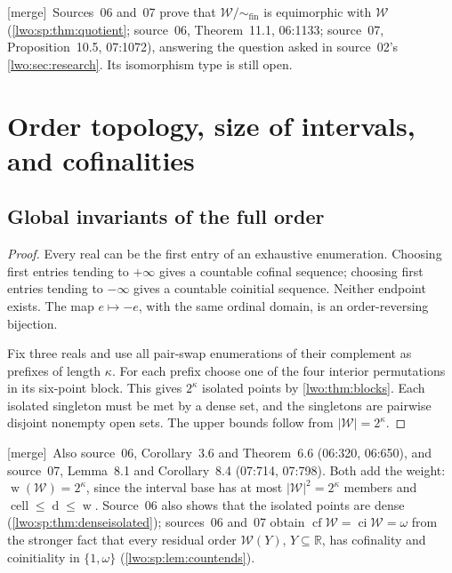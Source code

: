 \documentclass[11pt,a4paper]{article}
\newtheorem{proposition}[theorem]{Proposition}
\theoremstyle{definition}
\theoremstyle{remark}
\newcommand{\R}{\mathbb R}
\newcommand{\W}{\mathcal W}
\newcommand{\cf}{\operatorname{cf}}
\newcommand{\ci}{\operatorname{ci}}
\newcommand{\dens}{\operatorname{d}}
\newcommand{\cell}{\operatorname{cell}}
\newcommand{\weight}{\operatorname{w}}
\newcommand{\Wq}{\W/{\sim_{\mathrm{fin}}}}
\newcommand{\merge}{\textsf{[merge]}}
\begin{document}
\merge\ Sources~06 and~07 prove that $\Wq$ is equimorphic with $\W$
(\cref{lwo:sp:thm:quotient}; source~06, Theorem~11.1, 06:1133; source~07,
Proposition~10.5, 07:1072),
answering the question asked in source~02's \cref{lwo:sec:research}. Its
isomorphism type is still open.

\section{Order topology, size of intervals, and cofinalities}
\label{lwo:sec:topology}

\subsection{Global invariants of the full order}

\begin{proof}
Every real can be the first entry of an exhaustive enumeration. Choosing
first entries tending to $+\infty$ gives a countable cofinal sequence;
choosing first entries tending to $-\infty$ gives a countable coinitial
sequence. Neither endpoint exists. The map $e\mapsto -e$, with the same
ordinal domain, is an order-reversing bijection.

Fix three reals and use all pair-swap enumerations of their complement as
prefixes of length $\kappa$. For each prefix choose one of the four
interior permutations in its six-point block. This gives $2^\kappa$
isolated points by \cref{lwo:thm:blocks}. Each isolated singleton must be met
by a dense set, and the singletons are pairwise disjoint nonempty open
sets. The upper bounds follow from $|\W|=2^\kappa$.
\end{proof}
\merge\ Also source~06, Corollary~3.6 and Theorem~6.6 (06:320, 06:650),
and source~07, Lemma~8.1 and Corollary~8.4 (07:714, 07:798). Both add the
weight: $\weight(\W)=2^\kappa$, since the interval base has at most
$|\W|^2=2^\kappa$ members and $\cell\le\dens\le\weight$. Source~06 also
shows that the isolated points are dense (\cref{lwo:sp:thm:denseisolated});
sources~06 and~07 obtain $\cf\W=\ci\W=\omega$ from the stronger fact that every
residual order $\W(Y)$, $Y\subseteq\R$, has cofinality and coinitiality in
$\{1,\omega\}$ (\cref{lwo:sp:lem:countends}).
\end{document}
